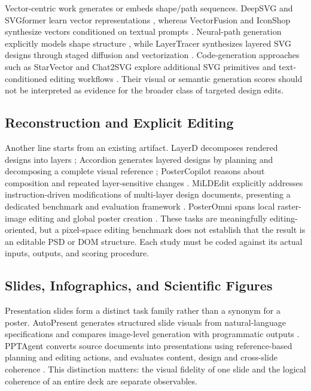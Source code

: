 Vector-centric work generates or embeds shape/path sequences. DeepSVG and SVGformer learn vector representations \citep{deepsvg2020,svgformer2023}, whereas VectorFusion and IconShop synthesize vectors conditioned on textual prompts \citep{vectorfusion2023,iconshop2023}. Neural-path generation explicitly models shape structure \citep{neuralpath2024}, while LayerTracer synthesizes layered SVG designs through staged diffusion and vectorization \citep{layertracer2025}. Code-generation approaches such as StarVector and Chat2SVG explore additional SVG primitives and text-conditioned editing workflows \citep{starvector2025,chat2svg2025}. Their visual or semantic generation scores should not be interpreted as evidence for the broader class of targeted design edits.

\subsection{Reconstruction and Explicit Editing}
Another line starts from an existing artifact. LayerD decomposes rendered designs into layers \citep{layerd2025}; Accordion generates layered designs by planning and decomposing a complete visual reference \citep{accordion2025}; PosterCopilot reasons about composition and repeated layer-sensitive changes \citep{postercopilot2026}. MiLDEdit explicitly addresses instruction-driven modifications of multi-layer design documents, presenting a dedicated benchmark and evaluation framework \citep{mildedit2026}. PosterOmni spans local raster-image editing and global poster creation \citep{posteromni2026}. These tasks are meaningfully editing-oriented, but a pixel-space editing benchmark does not establish that the result is an editable PSD or DOM structure. Each study must be coded against its actual inputs, outputs, and scoring procedure.

\subsection{Slides, Infographics, and Scientific Figures}
Presentation slides form a distinct task family rather than a synonym for a poster. AutoPresent generates structured slide visuals from natural-language specifications and compares image-level generation with programmatic outputs \citep{autopresent2025}. PPTAgent converts source documents into presentations using reference-based planning and editing actions, and evaluates content, design and cross-slide coherence \citep{pptagent2025}. This distinction matters: the visual fidelity of one slide and the logical coherence of an entire deck are separate observables.

